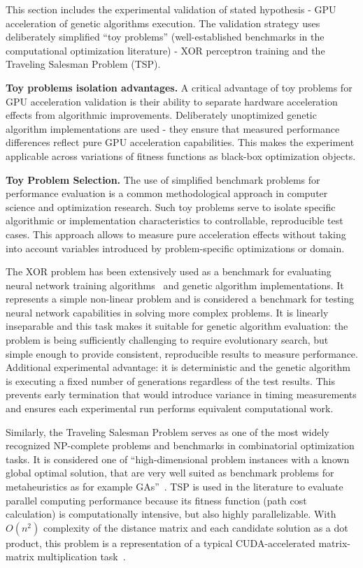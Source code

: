 \documentclass[a4paper,14pt]{extarticle}
\begin{document}

This section includes the experimental validation of stated hypothesis - GPU acceleration of genetic algorithms execution. The validation strategy uses deliberately simplified ``toy problems'' (well-established benchmarks in the computational optimization literature) - XOR perceptron training and the Traveling Salesman Problem (TSP).

\textbf{Toy problems isolation advantages.} A critical advantage of toy problems for GPU acceleration validation is their ability to separate hardware acceleration effects from algorithmic improvements. Deliberately unoptimized genetic algorithm implementations are used - they ensure that measured performance differences reflect pure GPU acceleration capabilities. This makes the experiment applicable across variations of fitness functions as black-box optimization objects.

\textbf{Toy Problem Selection.} The use of simplified benchmark problems for performance evaluation is a common methodological approach in computer science and optimization research. Such toy problems serve to isolate specific algorithmic or implementation characteristics to controllable, reproducible test cases. This approach allows to measure pure acceleration effects without taking into account variables introduced by problem-specific optimizations or domain.

The XOR problem has been extensively used as a benchmark for evaluating neural network training algorithms~\cite{googlebooks_xor_perceptron,schaffer2001genetic, samir2017xor} and genetic algorithm implementations. It represents a simple non-linear problem and is considered a benchmark for testing neural network capabilities in solving more complex problems. It is linearly inseparable and this task makes it suitable for genetic algorithm evaluation: the problem is being sufficiently challenging to require evolutionary search, but simple enough to provide consistent, reproducible results to measure performance. Additional experimental advantage: it is deterministic and the genetic algorithm is executing a fixed number of generations regardless of the test results. This prevents early termination that would introduce variance in timing measurements and ensures each experimental run performs equivalent computational work.

Similarly, the Traveling Salesman Problem serves as one of the most widely recognized NP-complete problems and benchmarks in combinatorial optimization tasks. It is considered one of ``high-dimensional problem instances with a known global optimal solution, that are very well suited as benchmark problems for metaheuristics as for example GAs''~\cite{affenzeller2009genetic}. TSP is used in the literature to evaluate parallel computing performance because its fitness function (path cost calculation) is computationally intensive, but also highly parallelizable. With $O(n^2)$ complexity of the distance matrix and each candidate solution as a dot product, this problem is a representation of a typical CUDA-accelerated matrix-matrix multiplication task~\cite{kirk2016programming}.
\end{document}
